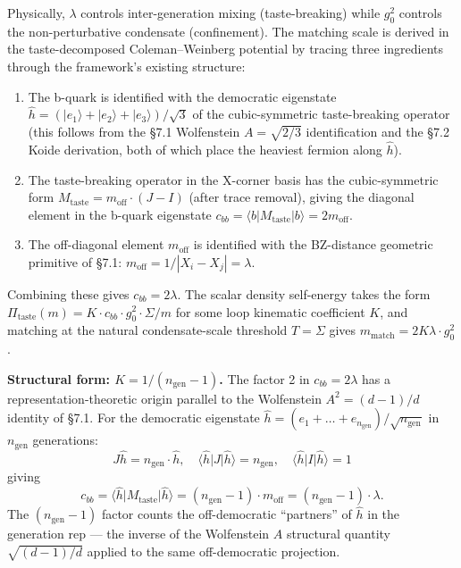 \documentclass[
]{article}
\begin{document}
Physically, \(\lambda\) controls inter-generation mixing
(taste-breaking) while \(g_0^2\) controls the non-perturbative
condensate (confinement). The matching scale is derived in the
taste-decomposed Coleman--Weinberg potential by tracing three
ingredients through the framework's existing structure:

\begin{enumerate}
\def\labelenumi{(\roman{enumi})}
\item
  The b-quark is identified with the democratic eigenstate
  \(\hat{h} = (|e_1\rangle + |e_2\rangle + |e_3\rangle)/\sqrt{3}\) of
  the cubic-symmetric taste-breaking operator (this follows from the
  §7.1 Wolfenstein \(A = \sqrt{2/3}\) identification and the §7.2 Koide
  derivation, both of which place the heaviest fermion along
  \(\hat{h}\)).
\item
  The taste-breaking operator in the X-corner basis has the
  cubic-symmetric form
  \(M_{\text{taste}} = m_{\text{off}} \cdot (J - I)\) (after trace
  removal), giving the diagonal element in the b-quark eigenstate
  \(c_{bb} = \langle b | M_{\text{taste}} | b \rangle = 2 m_{\text{off}}\).
\item
  The off-diagonal element \(m_{\text{off}}\) is identified with the
  BZ-distance geometric primitive of §7.1:
  \(m_{\text{off}} = 1/|X_i - X_j| = \lambda\).
\end{enumerate}

Combining these gives \(c_{bb} = 2\lambda\). The scalar density
self-energy takes the form
\(\Pi_{\text{taste}}(m) = K \cdot c_{bb} \cdot g_0^2 \cdot \Sigma/m\)
for some loop kinematic coefficient \(K\), and matching at the natural
condensate-scale threshold \(T = \Sigma\) gives
\(m_{\text{match}} = 2K \lambda \cdot g_0^2\).

\textbf{Structural form: \(K = 1/(n_{\text{gen}} - 1)\).} The factor 2
in \(c_{bb} = 2\lambda\) has a representation-theoretic origin parallel
to the Wolfenstein \(A^2 = (d-1)/d\) identity of §7.1. For the
democratic eigenstate
\(\hat h = (e_1 + \ldots + e_{n_{\text{gen}}})/\sqrt{n_{\text{gen}}}\)
in \(n_{\text{gen}}\) generations:
\[J\hat h = n_{\text{gen}} \cdot \hat h, \quad \langle \hat h | J | \hat h \rangle = n_{\text{gen}}, \quad \langle \hat h | I | \hat h \rangle = 1\]
giving
\[c_{bb} = \langle \hat h | M_{\text{taste}} | \hat h \rangle = (n_{\text{gen}} - 1) \cdot m_{\text{off}} = (n_{\text{gen}} - 1) \cdot \lambda.\]
The \((n_{\text{gen}} - 1)\) factor counts the off-democratic
``partners'' of \(\hat h\) in the generation rep --- the inverse of the
Wolfenstein \(A\) structural quantity \(\sqrt{(d-1)/d}\) applied to the
same off-democratic projection.
\end{document}

